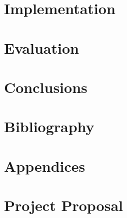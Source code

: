 \documentclass[12pt,twoside,notitlepage]{report}
\begin{document}
\chapter{Implementation}



\chapter{Evaluation}

\chapter{Conclusions}

\chapter{Bibliography}

\chapter{Appendices}

\chapter{Project Proposal}

\end{document}
